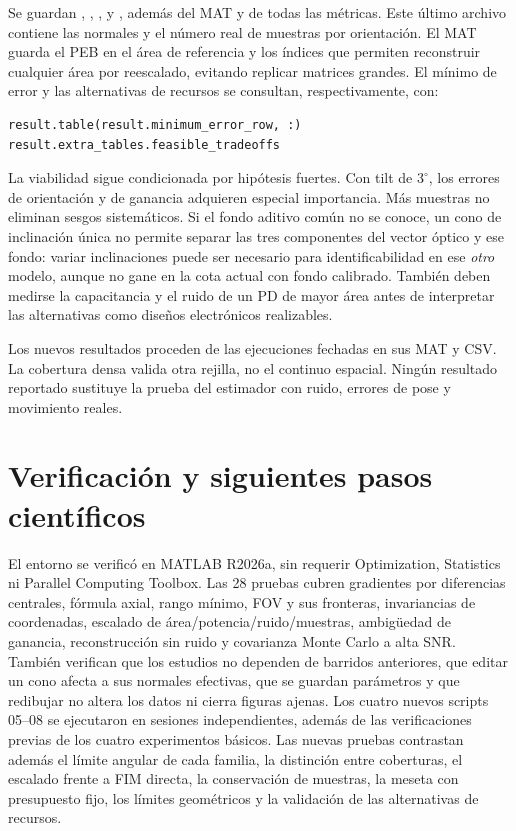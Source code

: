 \documentclass[11pt,a4paper]{article}
\begin{document}
Se guardan , , ,  y , además del MAT y de todas las métricas. Este último archivo contiene las normales y el número real de muestras por orientación. El MAT guarda el PEB en el área de referencia y los índices que permiten reconstruir cualquier área por reescalado, evitando replicar matrices grandes. El mínimo de error y las alternativas de recursos se consultan, respectivamente, con:
\begin{verbatim}
result.table(result.minimum_error_row, :)
result.extra_tables.feasible_tradeoffs
\end{verbatim}

La viabilidad sigue condicionada por hipótesis fuertes. Con tilt de $3^\circ$, los errores de orientación y de ganancia adquieren especial importancia. Más muestras no eliminan sesgos sistemáticos. Si el fondo aditivo común no se conoce, un cono de inclinación única no permite separar las tres componentes del vector óptico y ese fondo: variar inclinaciones puede ser necesario para identificabilidad en ese \emph{otro} modelo, aunque no gane en la cota actual con fondo calibrado. También deben medirse la capacitancia y el ruido de un PD de mayor área antes de interpretar las alternativas como diseños electrónicos realizables.

Los nuevos resultados proceden de las ejecuciones fechadas en sus MAT y CSV. La cobertura densa valida otra rejilla, no el continuo espacial. Ningún resultado reportado sustituye la prueba del estimador con ruido, errores de pose y movimiento reales.
\clearpage

\section{Verificación y siguientes pasos científicos}
El entorno se verificó en MATLAB R2026a, sin requerir Optimization, Statistics ni Parallel Computing Toolbox. Las 28 pruebas cubren gradientes por diferencias centrales, fórmula axial, rango mínimo, FOV y sus fronteras, invariancias de coordenadas, escalado de área/potencia/ruido/muestras, ambigüedad de ganancia, reconstrucción sin ruido y covarianza Monte Carlo a alta SNR. También verifican que los estudios no dependen de barridos anteriores, que editar un cono afecta a sus normales efectivas, que se guardan parámetros y que redibujar no altera los datos ni cierra figuras ajenas. Los cuatro nuevos scripts 05--08 se ejecutaron en sesiones independientes, además de las verificaciones previas de los cuatro experimentos básicos. Las nuevas pruebas contrastan además el límite angular de cada familia, la distinción entre coberturas, el escalado frente a FIM directa, la conservación de muestras, la meseta con presupuesto fijo, los límites geométricos y la validación de las alternativas de recursos.
\end{document}
